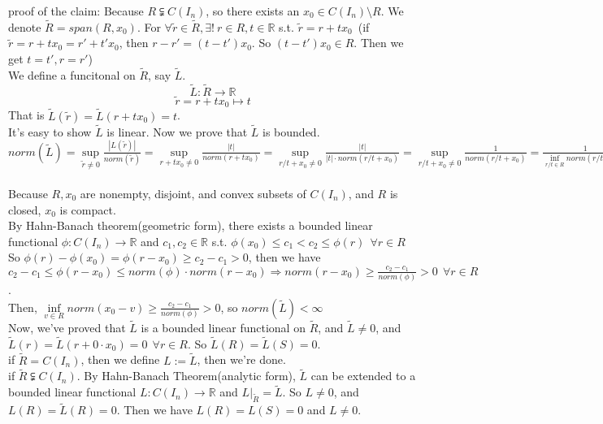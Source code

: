 proof of the claim: Because $R\subsetneqq C(I_n)$, so there exists an $x_0\in C(I_n) \setminus R$. We denote $\tilde{R}=span(R,x_0)$. For $\forall \tilde{r}\in \tilde{R}, \exists! \ r\in R, t\in \mathbb{R}$ s.t. $\tilde{r}=r+tx_0$\ (if $\tilde{r}=r+tx_0=r'+t'x_0$, then $r-r'=(t-t')x_0$. So $(t-t')x_0\in R$. Then we get $t=t', r=r'$)
~\\ We define a funcitonal on $\tilde{R}$, say $\tilde{L}$.
$$\tilde{L}: \tilde{R} \rightarrow \mathbb{R}$$
$$\tilde{r}=r+tx_0\mapsto t$$
That is $\tilde{L}(\tilde{r})=\tilde{L}(r+tx_0)=t$.
~\\It's easy to show $\tilde{L}$ is linear. Now we prove that $\tilde{L}$ is bounded.
~\\$norm(\tilde{L})=\mathop{sup}\limits_{\tilde{r}\neq0}\frac{|L(\tilde{r})|}{norm(\tilde{r})}=\mathop{sup}\limits_{r+tx_0\neq0}\frac{|t|}{norm(r+tx_0)}=\mathop{sup}\limits_{r/t+x_0\neq0}\frac{|t|}{|t|\cdot norm(r/t+x_0)}=\mathop{sup}\limits_{r/t+x_0\neq0}\frac{1}{norm(r/t+x_0)}=\frac{1}{\mathop{inf}\limits_{r/t\in R}norm(r/t+x_0)}=\frac{1}{\mathop{inf}\limits_{v\in R}norm(x_0-v)}$
~\\Because $R,x_0$ are nonempty, disjoint, and convex subsets of $C(I_n)$, and $R$ is closed, $x_0$ is compact.
~\\By Hahn-Banach theorem(geometric form), there exists a bounded linear functional $\phi: C(I_n)\rightarrow \mathbb{R}$ and $c_1, c_2\in \mathbb{R}$ s.t. $\phi(x_0)\le c_1<c_2\le \phi(r)\ \ \forall r\in R$
~\\So $\phi(r)-\phi(x_0)=\phi(r-x_0)\ge c_2-c_1>0$, then we have $c_2-c_1\le\phi(r-x_0)\le norm(\phi)\cdot norm(r-x_0)\Rightarrow norm(r-x_0)\ge\frac{c_2-c_1}{norm(\phi)}>0\ \ \forall r\in R$.
~\\Then, $\mathop{inf}\limits_{v\in R}norm(x_0-v)\ge\frac{c_2-c_1}{norm(\phi)}>0$, so $norm(\tilde{L})<\infty$
~\\Now, we've proved that $\tilde{L}$ is a bounded linear functional on $\tilde{R}$, and $\tilde{L}\neq 0$, and $\tilde{L}(r)=\tilde{L}(r+0\cdot x_0)=0\ \ \forall r\in R$. So $\tilde{L}(R)=\tilde{L}(S)=0$.
~\\if $\tilde{R}=C(I_n)$, then we define $L:=\tilde{L}$, then we're done.
~\\if $\tilde{R}\subsetneqq C(I_n)$. By Hahn-Banach Theorem(analytic form), $\tilde{L}$ can be extended to a bounded linear functional $L: C(I_n)\rightarrow \mathbb{R}$ and $L|_{\tilde{R}}=\tilde{L}$. So $L\neq0$, and $L(R)=\tilde{L}(R)=0$. Then we have $L(R)=L(S)=0$ and $L\neq0$.


